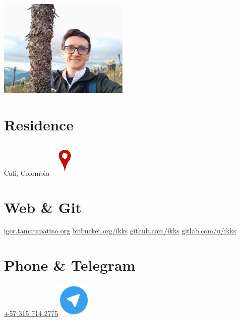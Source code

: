\begin{aside}
  \includegraphics[scale=0.28]{img/coruscan.jpg}
    ~
  \section{Residence}
    Cali, Colombia\includegraphics[scale=0.15]{img/ubicacion.png}
    ~
    ~
    ~
  \section{Web \& Git}
    \href{https://igor.tamarapatino.org}{igor.tamarapatino.org}
    \href{https://bitbucket.org/ikks}{bitbucket.org/ikks}
    \href{https://github.com/ikks}{github.com/ikks}
    \href{https://gitlab.com/ikks}{gitlab.com/u/ikks}
  \section{Phone \& Telegram}
    \href{callto:+573157142775}{+57 315 714 2775\includegraphics[scale=0.15]{img/telegram.png}}
    ~
    ~
    ~
    ~

\end{aside}
